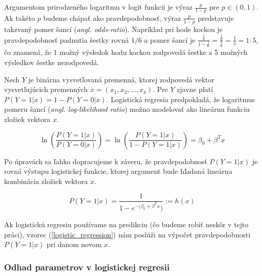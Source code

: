 \begin{center}
\end{center}

Argumentom prirodzeného logaritmu v logit funkcii je výraz \( \frac{p}{1 - p} \) pre \( p \in (0, 1) \).
Ak takéto \(p\) budeme chápať ako pravdepodobnosť, výraz \( \frac{p}{1 - p} \) predstavuje takzvaný pomer šancí (\emph{angl. odds-ratio}).
Napríklad pri hode kockou je pravdepodobnosť padnutia šestky rovná \( 1/6 \) a pomer šancí je \( \frac{\frac{1}{6}}{1 - \frac{1}{6}} = \frac{\frac{1}{6}}{\frac{5}{6}} = \frac{1}{5} = 1 : 5\),
čo znamená, že 1 možný výsledok hodu kockou zodpovedá šestke a 5 možných výsledkov šestke nezodpovedá.

Nech \( Y \) je binárna vysvetľovaná premenná, ktorej zodpovedá vektor vysvetľujúcich premenných \( x = (x_1, x_2, \ldots, x_k) \).
Pre \( Y \) zjavne platí \( P(Y = 1|x) = 1 - P(Y = 0|x) \).
Logistická regresia predpokladá, že logaritmus pomeru šancí (\emph{angl. log-likelihood ratio}) možno modelovať ako lineárnu funkciu zložiek vektora \( x \).

\[
\ln \left( \frac{P(Y = 1|x)}{P(Y = 0|x)} \right) = \ln \left( \frac{P(Y = 1|x)}{1 - P(Y = 1|x)} \right) = \beta_0 + \beta^T x
\]

Po úpravách sa ľahko dopracujeme k záveru, že pravdepodobnosť \( P(Y = 1|x) \) je rovná výstupu logistickej funkcie, ktorej argument bude hľadaná lineárna kombinácia zložiek vektora \( x \).

\begin{equation} \label{logistic_regression}
P(Y = 1|x) = \frac{1}{1 - e^{-(\beta_0 + \beta^T x})} := h(x)
\end{equation}

Ak logistickú regresiu používame na predikciu (čo budeme robiť neskôr v tejto práci),
vzorec (\ref{logistic_regression}) nám poslúži na výpočet pravdepodobnosti \( P(Y = 1|x) \) pri danom novom \( x \).

\subsubsection{Odhad parametrov v logistickej regresii}

